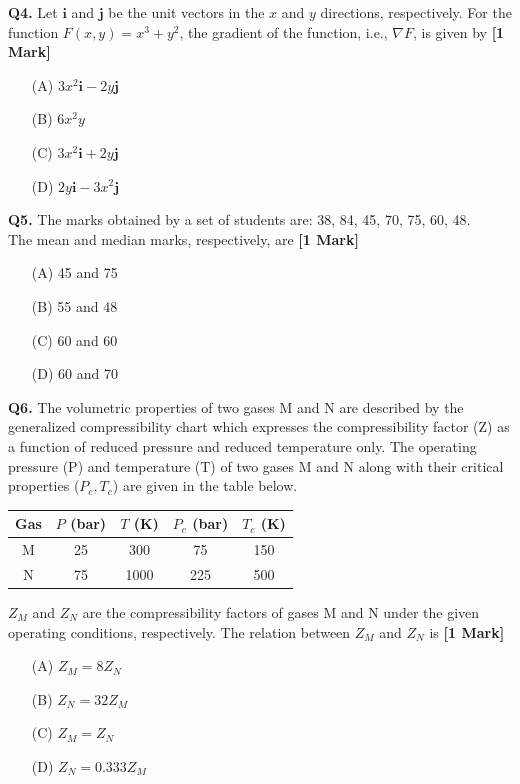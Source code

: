 \documentclass[11pt]{article}
\newcommand{\questiona}[2]{
    \noindent\textbf{Q#2.} #1 \hfill \textbf{[1 Mark]}
}
\begin{document}
\vspace{0.5cm}

\questiona{Let \( \mathbf{i} \) and \( \mathbf{j} \) be the unit vectors in the \( x \) and \( y \) directions, respectively. For the function \( F(x,y) = x^3 + y^2 \), the gradient of the function, i.e., \( \nabla F \), is given by}{4}
\begin{enumerate}
    \item[(A)] \( 3x^2\mathbf{i} - 2y\mathbf{j} \)  
    \item[(B)] \( 6x^2y \)  
    \item[(C)] \( 3x^2\mathbf{i} + 2y\mathbf{j} \)  
    \item[(D)] \( 2y\mathbf{i} - 3x^2\mathbf{j} \)  
\end{enumerate}
\vspace{0.5cm}

\questiona{The marks obtained by a set of students are: 38, 84, 45, 70, 75, 60, 48. \\ The mean and median marks, respectively, are}{5}
\begin{enumerate}
    \item[(A)] 45 and 75  
    \item[(B)] 55 and 48  
    \item[(C)] 60 and 60  
    \item[(D)] 60 and 70  
\end{enumerate}
\vspace{0.5cm}

\questiona{The volumetric properties of two gases M and N are described by the generalized compressibility chart which expresses the compressibility factor (Z) as a function of reduced pressure and reduced temperature only. The operating pressure (P) and temperature (T) of two gases M and N along with their critical properties (\( P_c, T_c \)) are given in the table below. \\

\begin{center}
\begin{tabular}{|c|c|c|c|c|}
\hline
Gas & \( P \) (bar) & \( T \) (K) & \( P_c \) (bar) & \( T_c \) (K) \\
\hline
M & 25 & 300 & 75 & 150 \\
N & 75 & 1000 & 225 & 500 \\
\hline
\end{tabular}
\end{center}

\( Z_M \) and \( Z_N \) are the compressibility factors of gases M and N under the given operating conditions, respectively. The relation between \( Z_M \) and \( Z_N \) is}{6}
\begin{enumerate}
    \item[(A)] \( Z_M = 8Z_N \)  
    \item[(B)] \( Z_N = 32Z_M \)  
    \item[(C)] \( Z_M = Z_N \)  
    \item[(D)] \( Z_N = 0.333Z_M \)  
\end{enumerate}
\vspace{0.5cm}
\end{document}
